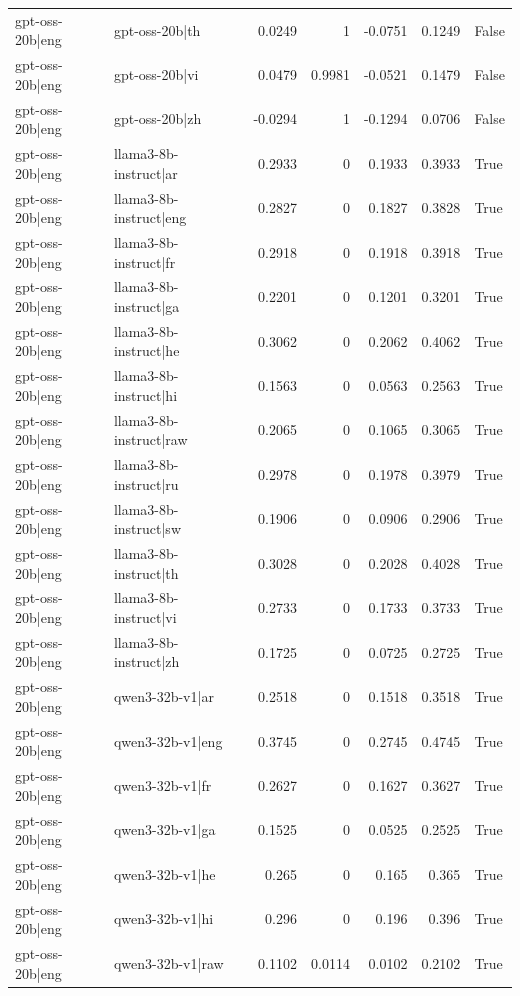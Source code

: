 \begin{table}
\begin{tabular}{l l r r r r l}
gpt-oss-20b|eng & gpt-oss-20b|th & 0.0249 & 1 & -0.0751 & 0.1249 & False \\
gpt-oss-20b|eng & gpt-oss-20b|vi & 0.0479 & 0.9981 & -0.0521 & 0.1479 & False \\
gpt-oss-20b|eng & gpt-oss-20b|zh & -0.0294 & 1 & -0.1294 & 0.0706 & False \\
gpt-oss-20b|eng & llama3-8b-instruct|ar & 0.2933 & 0 & 0.1933 & 0.3933 & True \\
gpt-oss-20b|eng & llama3-8b-instruct|eng & 0.2827 & 0 & 0.1827 & 0.3828 & True \\
gpt-oss-20b|eng & llama3-8b-instruct|fr & 0.2918 & 0 & 0.1918 & 0.3918 & True \\
gpt-oss-20b|eng & llama3-8b-instruct|ga & 0.2201 & 0 & 0.1201 & 0.3201 & True \\
gpt-oss-20b|eng & llama3-8b-instruct|he & 0.3062 & 0 & 0.2062 & 0.4062 & True \\
gpt-oss-20b|eng & llama3-8b-instruct|hi & 0.1563 & 0 & 0.0563 & 0.2563 & True \\
gpt-oss-20b|eng & llama3-8b-instruct|raw & 0.2065 & 0 & 0.1065 & 0.3065 & True \\
gpt-oss-20b|eng & llama3-8b-instruct|ru & 0.2978 & 0 & 0.1978 & 0.3979 & True \\
gpt-oss-20b|eng & llama3-8b-instruct|sw & 0.1906 & 0 & 0.0906 & 0.2906 & True \\
gpt-oss-20b|eng & llama3-8b-instruct|th & 0.3028 & 0 & 0.2028 & 0.4028 & True \\
gpt-oss-20b|eng & llama3-8b-instruct|vi & 0.2733 & 0 & 0.1733 & 0.3733 & True \\
gpt-oss-20b|eng & llama3-8b-instruct|zh & 0.1725 & 0 & 0.0725 & 0.2725 & True \\
gpt-oss-20b|eng & qwen3-32b-v1|ar & 0.2518 & 0 & 0.1518 & 0.3518 & True \\
gpt-oss-20b|eng & qwen3-32b-v1|eng & 0.3745 & 0 & 0.2745 & 0.4745 & True \\
gpt-oss-20b|eng & qwen3-32b-v1|fr & 0.2627 & 0 & 0.1627 & 0.3627 & True \\
gpt-oss-20b|eng & qwen3-32b-v1|ga & 0.1525 & 0 & 0.0525 & 0.2525 & True \\
gpt-oss-20b|eng & qwen3-32b-v1|he & 0.265 & 0 & 0.165 & 0.365 & True \\
gpt-oss-20b|eng & qwen3-32b-v1|hi & 0.296 & 0 & 0.196 & 0.396 & True \\
gpt-oss-20b|eng & qwen3-32b-v1|raw & 0.1102 & 0.0114 & 0.0102 & 0.2102 & True \\

\end{tabular}
\end{table}
